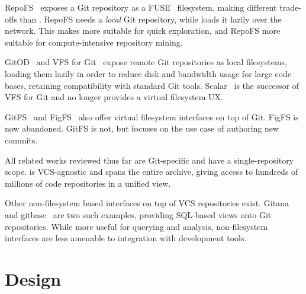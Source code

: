 RepoFS~\cite{spinellis2019repofs} exposes a Git repository as a
FUSE~\cite{fuse, vangoor2017fuseperf} filesystem, making different trade-offs
than \SWHFS{}. RepoFS needs a \emph{local} Git repository, while \SWHFS{} loads
it lazily over the network. This makes \SWHFS{} more suitable for quick
exploration, and RepoFS more suitable for compute-intensive repository mining.

GitOD~\cite{schroeder2012gitod} and VFS for Git~\cite{msvfsforgit} expose
remote Git repositories as local filesystems, loading them lazily in order to
reduce disk and bandwidth usage for large code bases, retaining compatibility
with standard Git tools.
Scalar~\cite{msscalar} is the successor of VFS for Git and no longer provides
a virtual filesystem UX\@.

GitFS~\cite{presslabs-gitfs} and FigFS~\cite{grant2009figfs} also offer virtual
filesystem interfaces on top of Git. FigFS is now abandoned. GitFS is not, but
focuses on the use case of authoring new commits.

All related works reviewed thus far are Git-specific and have a
single-repository scope. \SWHFS{} is VCS-agnostic and spans the entire \SWH{}
archive, giving access to hundreds of millions of code repositories in a
unified view.

Other non-filesystem based interfaces on top of VCS repositories exist.
Gitana~\cite{cosentino2018gitana} and gitbase~\cite{sourced-gitbase} are two
such examples, providing SQL-based views onto Git repositories. While more
useful for querying and analysis, non-filesystem interfaces are less amenable
to integration with development tools.

\section{Design}

